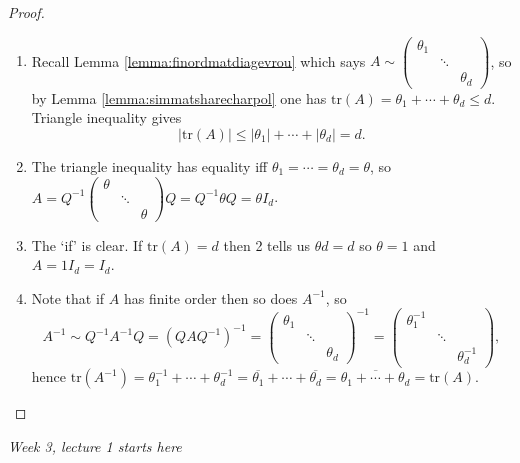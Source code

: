 \documentclass{article}
\newcommand{\tr}{\text{tr}}
\theoremstyle{definition}
\begin{document}
\begin{proof}
\begin{enumerate}
\item Recall Lemma \ref{lemma:finordmatdiagevrou} which says $A\sim \begin{pmatrix}\theta_1 & & \\& \ddots \\& & \theta_d\end{pmatrix}$, so by Lemma \ref{lemma:simmatsharecharpol} one has $\tr(A)=\theta_1+\cdots+\theta_d\leq d$. Triangle inequality gives
\[
|\tr(A)|\leq |\theta_1|+\cdots+|\theta_d|=d.
\]
\item The triangle inequality has equality iff $\theta_1=\cdots=\theta_d=\theta$, so $A=Q^{-1}\begin{pmatrix}
\theta & & \\
& \ddots \\
 & & \theta
\end{pmatrix}Q=Q^{-1}\theta Q=\theta I_d$.
\item The `if' is clear. If $\tr(A)=d$ then 2 tells us $\theta d=d$ so $\theta=1$ and $A=1I_d=I_d$.
\item Note that if $A$ has finite order then so does $A^{-1}$, so
\[
A^{-1}\sim Q^{-1}A^{-1}Q=\left(QAQ^{-1}\right)^{-1}=\begin{pmatrix}\theta_1 & & \\& \ddots \\& & \theta_d\end{pmatrix}^{-1}=\begin{pmatrix}\theta_1^{-1} & & \\& \ddots \\& & \theta_d^{-1}\end{pmatrix},
\]
hence $\tr\left(A^{-1}\right)=\theta_1^{-1}+\cdots+\theta_d^{-1}=\overline{\theta_1}+\cdots+\overline{\theta_d}=\overline{\theta_1+\cdots+\theta_d}=\tr(A)$.
\end{enumerate}
\end{proof}

\begin{flushright}
\textit{Week 3, lecture 1 starts here}
\end{flushright}
\end{document}
